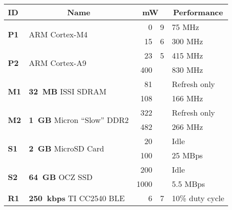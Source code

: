 \begin{table}[t]
\begin{threeparttable}
{\footnotesize
\begin{tabularx}{\columnwidth}{p{0.05in}lr@{.}lX}

\textbf{ID} &
\multicolumn{1}{c}{\textbf{Name}} &
\multicolumn{2}{c}{\textbf{mW}} &
\multicolumn{1}{c}{\textbf{Performance}}
\\ \toprule 

\multirow{2}{*}{\textbf{P1}} & \multirow{2}{*}{ARM Cortex-M4\tnote{1}~\cite{cortexm4-web}} &
0 & 9\tnote{2} &
75 MHz
\\

& &
15 & 6 &
300 MHz
\\ \cmidrule(l){2-5}

\multirow{2}{*}{\textbf{P2}} & \multirow{2}{*}{ARM Cortex-A9~\cite{cortexa9-web}} &
23 & 5\tnote{2} &
415 MHz
\\

& &
400 & &
830 MHz
\\ \toprule

\multirow{2}{*}{\textbf{M1}} & \multirow{2}{*}{\textbf{32~MB} ISSI SDRAM~\cite{issi32MBsdram-datasheet}} &
81 & &
Refresh only
\\

& &
108 & &
166 MHz
\\ \cmidrule(l){2-5}

\multirow{2}{*}{\textbf{M2}} & \multirow{2}{*}{\textbf{1~GB} Micron ``Slow'' DDR2} &
322 & \tnote{4} &
Refresh only
\\

& &
482 & &
266 MHz
\\ \toprule

\multirow{2}{*}{\textbf{S1}} & \multirow{2}{*}{\textbf{2~GB} MicroSD Card} &
20 & \tnote{5} &
Idle
\\

& &
100 & \tnote{5} &
25 MBps\tnote{6}
\\ \cmidrule(l){2-5}

\multirow{2}{*}{\textbf{S2}} & \multirow{2}{*}{\textbf{64~GB} OCZ SSD} &
200 & \tnote{7} &
Idle
\\

& &
1000 & \tnote{7} &
5.5 MBps\tnote{7}
\\ \toprule

\multirow{2}{*}{\textbf{R1}} & \multirow{2}{*}{\textbf{250~kbps} TI CC2540 BLE} & 
6 & 7\tnote{3} &
10\% duty cycle\tnote{8}
\\


\end{tabularx}}
\end{threeparttable}
\end{table}

